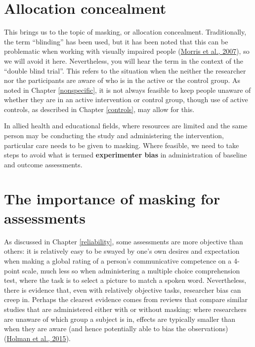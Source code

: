 \documentclass{krantz}
\begin{document}
\hypertarget{allocation-concealment}{%
\section{Allocation concealment}\label{allocation-concealment}}

This brings us to the topic of masking, or allocation concealment. Traditionally, the term ``blinding'' has been used, but it has been noted that this can be problematic when working with visually impaired people (\protect\hyperlink{ref-morris2007}{Morris et al., 2007}), so we will avoid it here. Nevertheless, you will hear the term in the context of the ``double blind trial''. This refers to the situation when the neither the researcher nor the participants are aware of who is in the active or the control group. As noted in Chapter \ref{nonspecific}, it is not always feasible to keep people unaware of whether they are in an active intervention or control group, though use of active controls, as described in Chapter \ref{controls}, may allow for this.

In allied health and educational fields, where resources are limited and the same person may be conducting the study and administering the intervention, particular care needs to be given to masking. Where feasible, we need to take steps to avoid what is termed \textbf{experimenter bias} in administration of baseline and outcome assessments.

\hypertarget{the-importance-of-masking-for-assessments}{%
\section{The importance of masking for assessments}\label{the-importance-of-masking-for-assessments}}

As discussed in Chapter \ref{reliability}, some assessments are more objective than others: it is relatively easy to be swayed by one's own desires and expectation when making a global rating of a person's communicative competence on a 4-point scale, much less so when administering a multiple choice comprehension test, where the task is to select a picture to match a spoken word. Nevertheless, there is evidence that, even with relatively objective tasks, researcher bias can creep in. Perhaps the clearest evidence comes from reviews that compare similar studies that are administered either with or without masking: where researchers are unaware of which group a subject is in, effects are typically smaller than when they are aware (and hence potentially able to bias the observations) (\protect\hyperlink{ref-holman2015}{Holman et al., 2015}).
\end{document}
